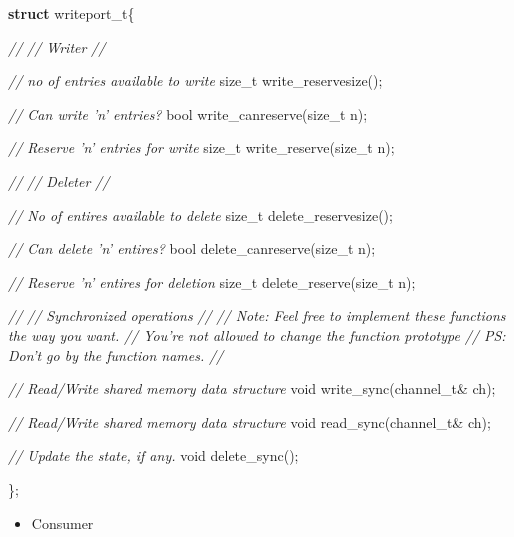 \documentclass[]{article}
\newenvironment{Shaded}{}{}
\newcommand{\KeywordTok}[1]{\textbf{{#1}}}
\newcommand{\DataTypeTok}[1]{\textcolor[rgb]{0.50,0.00,0.00}{{#1}}}
\newcommand{\CommentTok}[1]{\textcolor[rgb]{0.50,0.50,0.50}{\textit{{#1}}}}
\newcommand{\NormalTok}[1]{{#1}}
\providecommand{\tightlist}{%
  \setlength{\itemsep}{0pt}\setlength{\parskip}{0pt}}
\begin{document}
\begin{Shaded}
\begin{Highlighting}[]

\KeywordTok{struct} \NormalTok{writeport_t\{}


  \CommentTok{//}
  \CommentTok{// Writer}
  \CommentTok{//}


  \CommentTok{// no of entries available to write}
  \DataTypeTok{size_t} \NormalTok{write_reservesize();}

  \CommentTok{// Can write 'n' entries?}
  \NormalTok{bool write_canreserve(}\DataTypeTok{size_t} \NormalTok{n);}

  \CommentTok{// Reserve 'n' entries for write}
  \DataTypeTok{size_t} \NormalTok{write_reserve(}\DataTypeTok{size_t} \NormalTok{n);}


  \CommentTok{//}
  \CommentTok{// Deleter}
  \CommentTok{//}


  \CommentTok{// No of entires available to delete}
  \DataTypeTok{size_t} \NormalTok{delete_reservesize();}


  \CommentTok{// Can delete 'n' entires?}
  \NormalTok{bool delete_canreserve(}\DataTypeTok{size_t} \NormalTok{n);}


  \CommentTok{// Reserve 'n' entires for deletion}
  \DataTypeTok{size_t} \NormalTok{delete_reserve(}\DataTypeTok{size_t} \NormalTok{n);}



  \CommentTok{//}
  \CommentTok{// Synchronized operations}
  \CommentTok{//}
  \CommentTok{// Note: Feel free to implement these functions the way you want.}
  \CommentTok{//       You're not allowed to change the function prototype}
  \CommentTok{// PS:   Don't go by the function names.}
  \CommentTok{//}

  \CommentTok{// Read/Write shared memory data structure}
  \DataTypeTok{void} \NormalTok{write_sync(channel_t& ch);}

  \CommentTok{// Read/Write shared memory data structure}
  \DataTypeTok{void} \NormalTok{read_sync(channel_t& ch);}

  \CommentTok{// Update the state, if any.}
  \DataTypeTok{void} \NormalTok{delete_sync();}


\NormalTok{\};}
\end{Highlighting}
\end{Shaded}

\begin{itemize}
\tightlist
\item
  Consumer
\end{itemize}
\end{document}
